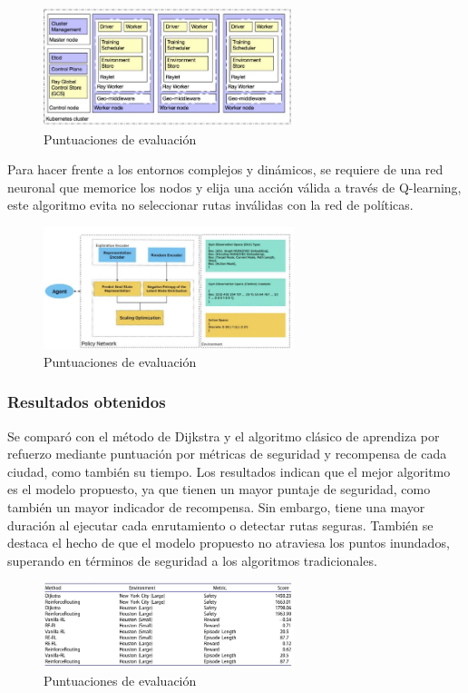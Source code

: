 \begin{figure}[h]
	\begin{center}
		\includegraphics[width=0.65\textwidth]{2/figures/algoMod.jpg}
		\caption{Puntuaciones de evaluación}
		\label{1:fig2}
	\end{center}
\end{figure}

Para hacer frente a los entornos complejos y dinámicos, se requiere de una red neuronal que memorice los nodos y elija una acción válida a través de Q-learning, este algoritmo evita no seleccionar rutas inválidas con la red de políticas.

\begin{figure}[h]
	\begin{center}
		\includegraphics[width=0.65\textwidth]{2/figures/politica.jpg}
		\caption{Puntuaciones de evaluación}
		\label{1:fig2}
	\end{center}
\end{figure}

\subsubsection{Resultados obtenidos}
Se comparó con el método de Dijkstra y el algoritmo clásico de aprendiza por refuerzo mediante puntuación por métricas de seguridad y recompensa de cada ciudad, como también su tiempo. Los resultados indican que el mejor algoritmo es el modelo propuesto, ya que tienen un mayor puntaje de seguridad, como también un mayor indicador de recompensa. Sin embargo, tiene una mayor duración al ejecutar cada enrutamiento o detectar rutas seguras. También se destaca el hecho de que el modelo propuesto no atraviesa los puntos inundados, superando en términos de seguridad a los algoritmos tradicionales.

\begin{figure}[h]
	\begin{center}
		\includegraphics[width=0.65\textwidth]{2/figures/resultN.jpg}
		\caption{Puntuaciones de evaluación}
		\label{1:fig2}
	\end{center}
\end{figure}
